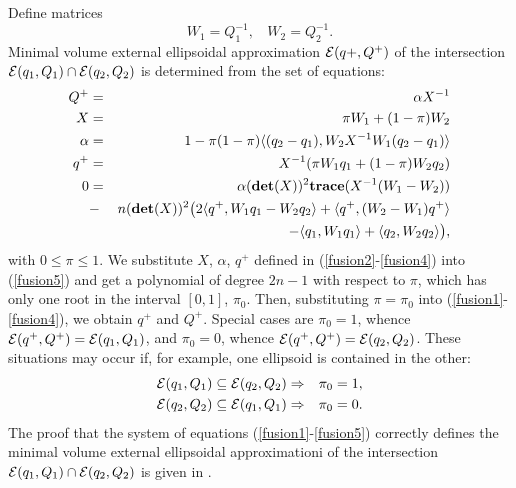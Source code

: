 \documentclass{report}
\newcommand{\EE}{{\cal E}}
\begin{document}
Define matrices
\begin{equation}
W_1 = Q_1^{-1}, ~~~~ W_2 = Q_2^{-1} .\label{wmatrices}
\end{equation}
Minimal volume external ellipsoidal approximation $\EE(q+,Q^+)$ of
the intersection $\EE(q_1,Q_1)\cap\EE(q_2,Q_2)$ is determined from the set
of equations:
\begin{eqnarray}
Q^+ & = & \alpha X^{-1} \label{fusion1} \\
X & = & \pi W_1 + (1-\pi)W_2 \label{fusion2} \\
\alpha & = & 1-\pi(1-\pi)\langle(q_2-q_1), W_2X^{-1}W_1(q_2-q_1)\rangle
\label{fusion3} \\
q^+ & = & X^{-1}(\pi W_1q_1 + (1-\pi)W_2q_2) \label{fusion4} \\
0 & = & \alpha({\bf det}(X))^2{\bf trace}(X^{-1}(W_1-W_2)) \nonumber \\
& - & n({\bf det}(X))^2
\big{(}2\langle q^+,W_1q_1-W_2q_2\rangle +
\langle q^+,(W_2-W_1)q^+\rangle \nonumber\\
&  & - \langle q_1,W_1q_1\rangle +
\langle q_2,W_2q_2\rangle\big{)}, \label{fusion5}
\end{eqnarray}
with $0\leq\pi\leq1$. We substitute $X$, $\alpha$, $q^+$ defined in
(\ref{fusion2}-\ref{fusion4}) into (\ref{fusion5}) and get a polynomial of
degree $2n-1$ with respect to $\pi$, which has only one root in the
interval $[0,1]$, $\pi_0$. Then, substituting $\pi=\pi_0$ into
(\ref{fusion1}-\ref{fusion4}), we obtain $q^+$ and $Q^+$.
Special cases are $\pi_0=1$, whence $\EE(q^+,Q^+)=\EE(q_1,Q_1)$, and
$\pi_0=0$, whence $\EE(q^+,Q^+)=\EE(q_2,Q_2)$. These situations may occur
if, for example, one ellipsoid is contained in the other:
\begin{eqnarray*}
\EE(q_1,Q_1)\subseteq\EE(q_2,Q_2) & \Rightarrow & \pi_0 = 1,\\
\EE(q_2,Q_2)\subseteq\EE(q_1,Q_1) & \Rightarrow & \pi_0 = 0.\\
\end{eqnarray*}
The proof that the system of equations (\ref{fusion1}-\ref{fusion5})
correctly defines the minimal volume external ellipsoidal approximationi
of the intersection $\EE(q_1,Q_1)\cap\EE(q_2,Q_2)$ is given in \cite{fusion}.
\end{document}
